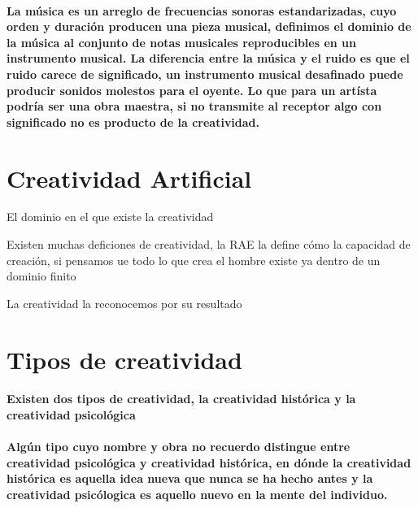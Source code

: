 \paragraph{La música es un arreglo de frecuencias sonoras estandarizadas, cuyo orden y duración producen una pieza musical, definimos el dominio de la música al conjunto de notas musicales reproducibles en un instrumento musical. La diferencia entre la música y el ruido es que el ruido carece de significado, un instrumento musical desafinado puede producir sonidos molestos para el oyente. Lo que para un artísta podría ser una obra maestra, si no transmite al receptor algo con significado no es producto de la creatividad.}

\section{Creatividad Artificial}

El dominio en el que existe la creatividad


Existen muchas deficiones de creatividad, la RAE la define cómo la capacidad de creación, si pensamos ue todo lo que crea el hombre existe ya dentro de un dominio finito


La creatividad la reconocemos por su resultado

\section{Tipos de creatividad}

\paragraph{Existen dos tipos de creatividad, la creatividad histórica y la creatividad psicológica\cite{pensamiento-creativo} }
\paragraph{Algún tipo cuyo nombre y obra no recuerdo  distingue entre creatividad psicológica y creatividad histórica, en dónde la creatividad histórica es aquella idea nueva que nunca se ha hecho antes y la creatividad psicólogica es aquello nuevo en la mente del individuo.}


\begin{comment}
    De existir una máquina capaz de analizar el lenguaje humano, e.i. operar con todo el conocimiento humano disponible y los problemas humano, esa máquina sería capaz de proponer soluciones novedosas a los problemas humanos.

    ¿Es posible crear una máquina que invente un avión a partir de las leyes de la física y el requisito: volar?
\end{comment}


